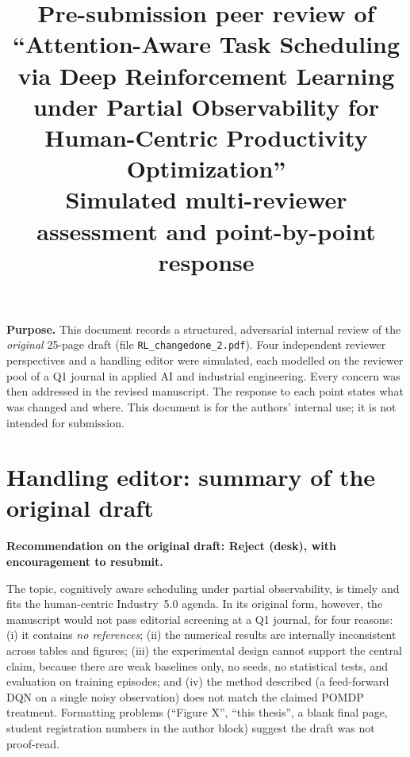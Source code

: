 \documentclass[11pt]{article}
\title{Pre-submission peer review of\\``Attention-Aware Task Scheduling via Deep Reinforcement Learning under Partial Observability for Human-Centric Productivity Optimization''\\[4pt]\large Simulated multi-reviewer assessment and point-by-point response}
\date{}
\begin{document}
\maketitle

\noindent\textbf{Purpose.} This document records a structured, adversarial internal review of the \emph{original} 25-page draft (file \texttt{RL\_changedone\_2.pdf}). Four independent reviewer perspectives and a handling editor were simulated, each modelled on the reviewer pool of a Q1 journal in applied AI and industrial engineering. Every concern was then addressed in the revised manuscript. The response to each point states what was changed and where. This document is for the authors' internal use; it is not intended for submission.

\section{Handling editor: summary of the original draft}
\textbf{Recommendation on the original draft: Reject (desk), with encouragement to resubmit.}

The topic, cognitively aware scheduling under partial observability, is timely and fits the human-centric Industry~5.0 agenda. In its original form, however, the manuscript would not pass editorial screening at a Q1 journal, for four reasons: (i) it contains \emph{no references}; (ii) the numerical results are internally inconsistent across tables and figures; (iii) the experimental design cannot support the central claim, because there are weak baselines only, no seeds, no statistical tests, and evaluation on training episodes; and (iv) the method described (a feed-forward DQN on a single noisy observation) does not match the claimed POMDP treatment. Formatting problems (``Figure X'', ``this thesis'', a blank final page, student registration numbers in the author block) suggest the draft was not proof-read.
\end{document}
